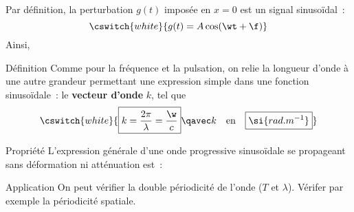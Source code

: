 \documentclass[../main/main.tex]{subfiles}
\begin{document}
Par définition, la perturbation $g(t)$ imposée en $x=0$ est un signal
sinusoïdal~:
\[\cswitch{white}{g(t) = A\cos(\wt+\f)}\]
Ainsi,
\begin{bdefi}{Définition}
    Comme pour la fréquence et la pulsation, on relie la longueur d'onde à une
    autre grandeur permettant une expression simple dans une fonction
    sinusoïdale~: le \textbf{vecteur d'onde} $k$, tel que
    \[\cswitch{white}{\boxed{k = \frac{2\pi}{\lambda} = \frac{\w}{c}}
    \qavec
    k\quad\text{en}\quad\boxed{\si{rad.m^{-1}}}}\]
\end{bdefi}
\begin{bprop}{Propriété}
    L'expression générale d'une onde progressive sinusoïdale se propageant sans
    déformation ni atténuation est~:
    \vspace{-10pt}
\end{bprop}

\begin{rexem}{Application}
    On peut vérifier la double périodicité de l'onde ($T$ et $\lambda$). Vérifer
    par exemple la périodicité spatiale.
    \vspace{-20pt}
\end{rexem}
\end{document}
